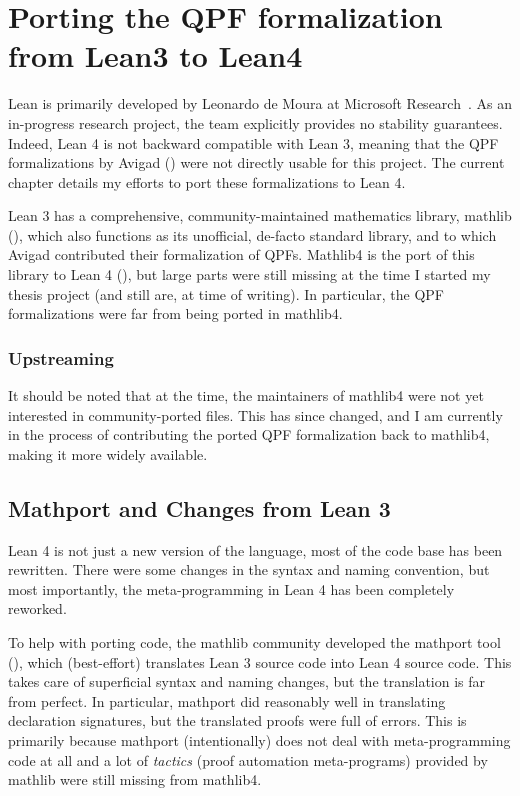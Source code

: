 
\chapter{Porting the QPF formalization from Lean3 to Lean4}%
\label{ch:porting}

Lean is primarily developed by Leonardo de Moura \etal{} at Microsoft Research~\cite{demouraLeanTheoremProver2015, avigadTheoremProvingLean}. As an in-progress research project, the team explicitly provides no stability guarantees. Indeed, Lean 4 is not backward compatible with Lean 3, meaning that the QPF formalizations by Avigad \etal{}
(\cite{avigadDataTypesQuotients2019a}) were not directly usable for this project. The current chapter details my efforts to port these formalizations to Lean 4.



Lean 3 has a comprehensive, community-maintained mathematics library, mathlib (\cite{themathlibcommunityLeanMathematicalLibrary2020}), 
which also functions as its unofficial, de-facto standard library, and to which Avigad \etal contributed
their formalization of QPFs.
Mathlib4 is the port of this library to Lean 4 (\cite{mathlib4}),
but large parts were still missing at the time I started my thesis project (and still are, at time of writing).
In particular, the QPF formalizations were far from being ported in mathlib4.



\subsection*{Upstreaming}
It should be noted that at the time, the maintainers of mathlib4 were not yet interested in 
community-ported files. This has since changed, and I am currently in the process of contributing
the ported QPF formalization back to mathlib4, making it more widely available.




\section{Mathport and Changes from Lean 3}
Lean 4 is not just a new version of the language, most of the code base has been rewritten.
There were some changes in the syntax and naming convention, but most importantly, 
the meta-programming in Lean 4 has been completely reworked.

To help with porting code, the mathlib community developed the mathport tool (\cite{mathport}), which 
(best-effort) translates Lean 3 source code into Lean 4 source code. This takes care of superficial 
syntax and naming changes, but the translation is far from perfect.
In particular, mathport did reasonably well in translating declaration signatures, 
but the translated proofs were full of errors.
This is primarily because mathport (intentionally) does not deal with meta-programming code at all and a lot
of \emph{tactics} (proof automation meta-programs) provided by mathlib were still missing from mathlib4.


